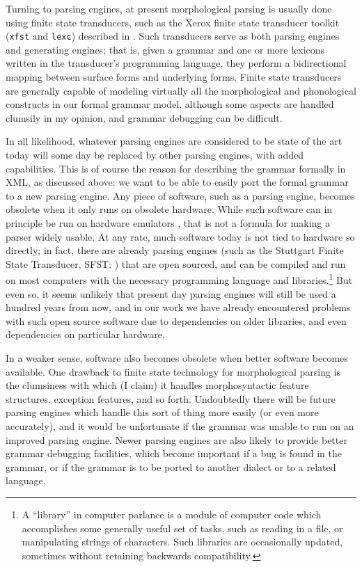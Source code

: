 Turning to parsing engines, at present morphological parsing is usually done using finite state transducers, such as the Xerox finite state transducer toolkit (\texttt{xfst} and \texttt{lexc}) described in \citet{BeesleyEtAl2003}. Such transducers serve as both parsing engines and generating engines; that is, given a grammar and one or more lexicons written in the transducer's programming language, they perform a bidirectional mapping between surface forms and underlying forms.  Finite state transducers are generally capable of modeling virtually all the morphological and phonological constructs in our formal grammar model, although some aspects are handled clumsily in my opinion, and grammar debugging can be difficult. 

In all likelihood, whatever parsing engines are considered to be state of the art today will some day be replaced by other parsing engines, with added capabilities. This is of course the reason for describing the grammar formally in XML, as discussed above: we want to be able to easily port the formal grammar to a new parsing engine. Any piece of software, such as a parsing engine, becomes obsolete when it only runs on obsolete hardware. While such software can in principle be run on hardware emulators \citep[chapter 4]{BorghoffEtAl2003}, that is not a formula for making a parser widely usable. At any rate, much software today is not tied to hardware so directly; in fact, there are already parsing engines (such as the Stuttgart Finite State Transducer, SFST: \citep{Schmid2005}) that are open sourced, and can be compiled and run on most computers with the necessary programming language and libraries.\footnote{A
  ``library'' in computer parlance is a module of computer code which accomplishes some generally useful set of tasks, such as reading in a file, or manipulating strings of characters. Such libraries are occasionally updated, sometimes without retaining backwards compatibility.
} 
But even so, it seems unlikely that present day parsing engines will still be used a hundred years from now, and in our work we have already encountered problems with such open source software due to dependencies on older libraries, and even dependencies on particular hardware.

In a weaker sense, software also becomes obsolete when better software becomes available. One drawback to finite state technology for morphological parsing is the clumsiness with which (I claim) it handles morphosyntactic feature structures, exception features, and so forth. Undoubtedly there will be future parsing engines which handle this sort of thing more easily (or even more accurately), and it would be unfortunate if the grammar was unable to run on an improved parsing engine. Newer parsing engines are also likely to provide better grammar debugging facilities, which become important if a bug is found in the grammar, or if the grammar is to be ported to another dialect or to a related language.

